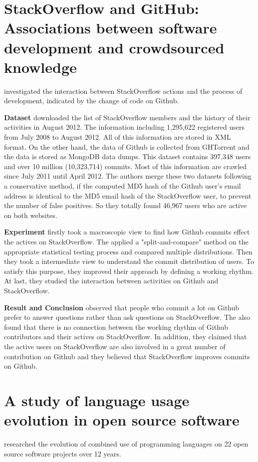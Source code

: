 \documentclass[12pt,oneside,final]{vlsithesis}
\begin{document}
\section{StackOverflow and GitHub: Associations between software development and crowdsourced knowledge}
\citet{vasilescu2013stackoverflow} investigated the interaction between StackOverflow actions and the process of development, indicated by the change of code on Github. 

\textbf{Dataset}
\citet{vasilescu2013stackoverflow} downloaded the list of StackOverflow members and the history of their activities in August 2012. The information including 1,295,622 registered users from July 2008 to August 2012. All of this information are stored in XML format. On the other hand, the data of Github is collected from GHTorrent\cite{gousios2012ghtorrent} and the data is stored as MongoDB data dumps. This dataset contains 397,348 users and over 10 million (10,323,714) commits. Most of this information are crawled since July 2011 until April 2012. The authors merge these two datasets following a conservative method, if the computed MD5 hash of the Github user's email address is identical to the MD5 email hash of the StackOverflow user, to prevent the number of false positives. So they totally found 46,967 users who are active on both websites. 

\textbf{Experiment}
\citet{vasilescu2013stackoverflow} firstly took a macroscopic view to find how Github commits effect the actives on StackOverflow. The applied a "split-and-compare" method on the appropriate statistical testing process and compared multiple distributions. Then they took a intermediate view to understand the commit distribution of users. To satisfy this purpose, they improved their approach by defining a working rhythm. At last, they studied the interaction between activities on  Github and StackOverflow. 

\textbf{Result and Conclusion}
\citet{vasilescu2013stackoverflow} observed that people who commit a lot on Github prefer to answer questions rather than ask questions on StackOverflow. The also found that there is no connection between the working rhythm of Github contributors and their actives on StackOverflow.  In addition, they claimed that the active users on StackOverflow are also involved in a great number of contribution on Github  and they believed that StackOverflow improves commits on Github. 
\section{A study of language usage evolution in open source software}
\citet{karus2011study} researched the evolution of combined use of programming languages on 22 open source software projects over 12 years. 
\end{document}
